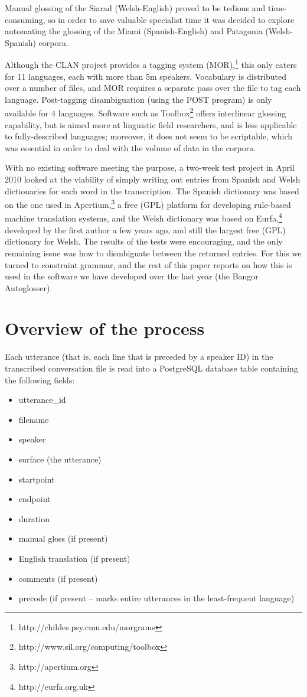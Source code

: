 \documentclass[11pt]{article}
\begin{document}
Manual glossing of the Siarad (Welsh-English) proved to be tedious and time-consuming, so in order to save valuable specialist time it was decided to explore automating the glossing of the Miami (Spanish-English) and Patagonia (Welsh-Spanish) corpora.

Although the CLAN project provides a tagging system (MOR),\footnote{http://childes.psy.cmu.edu/morgrams} this only caters for 11 languages, each with more than 5m speakers.  Vocabulary is distributed over a number of files, and MOR requires a separate pass over the file to tag each language.  Post-tagging disambiguation (using the POST program) is only available for 4 languages.  Software such as Toolbox\footnote{http://www.sil.org/computing/toolbox} offers interlinear glossing capability, but is aimed more at linguistic field researchers, and is less applicable to fully-described languages; moreover, it does not seem to be scriptable, which was essential in order to deal with the volume of data in the corpora. 

With no existing software meeting the purpose, a two-week test project in April 2010 looked at the viability of simply writing out entries from Spanish and Welsh dictionaries for each word in the transcription.  The Spanish dictionary was based on the one used in Apertium,\footnote{http://apertium.org} a free (GPL) platform for developing rule-based machine translation systems, and the Welsh dictionary was based on Eurfa,\footnote{http://eurfa.org.uk} developed by the first author a few years ago, and still the largest free (GPL) dictionary for Welsh.  The results of the tests were encouraging, and the only remaining issue was how to dismbiguate between the returned entries.  For this we turned to constraint grammar, and the rest of this paper reports on how this is used in the software we have developed over the last year (the Bangor Autoglosser).


\section{Overview of the process}
\label{sec:autoglosser}

Each utterance (that is, each line that is preceded by a speaker ID) in the transcribed conversation file is read into a PostgreSQL database table containing the following fields:
\begin{itemize}
\setlength{\itemsep}{-2mm}
\item utterance\_id
\item filename
\item speaker
\item surface (the utterance)
\item startpoint
\item endpoint
\item duration
\item manual gloss (if present)
\item English translation (if present)
\item comments (if present)
\item precode (if present -- marks entire utterances in the least-frequent language)
\end{itemize}
\end{document}
